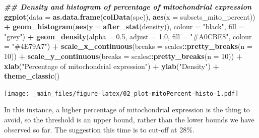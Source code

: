 \documentclass[
]{book}
\newenvironment{Shaded}{\begin{snugshade}}{\end{snugshade}}
\newcommand{\AttributeTok}[1]{\textcolor[rgb]{0.13,0.29,0.53}{#1}}
\newcommand{\DecValTok}[1]{\textcolor[rgb]{0.00,0.00,0.81}{#1}}
\newcommand{\DocumentationTok}[1]{\textcolor[rgb]{0.56,0.35,0.01}{\textbf{\textit{#1}}}}
\newcommand{\FloatTok}[1]{\textcolor[rgb]{0.00,0.00,0.81}{#1}}
\newcommand{\FunctionTok}[1]{\textcolor[rgb]{0.13,0.29,0.53}{\textbf{#1}}}
\newcommand{\NormalTok}[1]{#1}
\newcommand{\SpecialCharTok}[1]{\textcolor[rgb]{0.81,0.36,0.00}{\textbf{#1}}}
\newcommand{\StringTok}[1]{\textcolor[rgb]{0.31,0.60,0.02}{#1}}
\begin{document}
\begin{Shaded}
\begin{Highlighting}[]
\DocumentationTok{\#\# Density and histogram of percentage of mitochondrial expression}
\FunctionTok{ggplot}\NormalTok{(}\AttributeTok{data =} \FunctionTok{as.data.frame}\NormalTok{(}\FunctionTok{colData}\NormalTok{(spe)),}
       \FunctionTok{aes}\NormalTok{(}\AttributeTok{x =}\NormalTok{ subsets\_mito\_percent)) }\SpecialCharTok{+}
  \FunctionTok{geom\_histogram}\NormalTok{(}\FunctionTok{aes}\NormalTok{(}\AttributeTok{y =} \FunctionTok{after\_stat}\NormalTok{(density)), }
                 \AttributeTok{colour =} \StringTok{"black"}\NormalTok{, }
                 \AttributeTok{fill =} \StringTok{"grey"}\NormalTok{) }\SpecialCharTok{+}
  \FunctionTok{geom\_density}\NormalTok{(}\AttributeTok{alpha =} \FloatTok{0.5}\NormalTok{,}
               \AttributeTok{adjust =} \FloatTok{1.0}\NormalTok{,}
               \AttributeTok{fill =} \StringTok{"\#A0CBE8"}\NormalTok{,}
               \AttributeTok{colour =} \StringTok{"\#4E79A7"}\NormalTok{) }\SpecialCharTok{+}
  \FunctionTok{scale\_x\_continuous}\NormalTok{(}\AttributeTok{breaks =}\NormalTok{ scales}\SpecialCharTok{::}\FunctionTok{pretty\_breaks}\NormalTok{(}\AttributeTok{n =} \DecValTok{10}\NormalTok{)) }\SpecialCharTok{+} 
  \FunctionTok{scale\_y\_continuous}\NormalTok{(}\AttributeTok{breaks =}\NormalTok{ scales}\SpecialCharTok{::}\FunctionTok{pretty\_breaks}\NormalTok{(}\AttributeTok{n =} \DecValTok{10}\NormalTok{)) }\SpecialCharTok{+} 
  \FunctionTok{xlab}\NormalTok{(}\StringTok{"Percentage of mitochondrial expression"}\NormalTok{) }\SpecialCharTok{+} 
  \FunctionTok{ylab}\NormalTok{(}\StringTok{"Density"}\NormalTok{) }\SpecialCharTok{+} 
  \FunctionTok{theme\_classic}\NormalTok{()}
\end{Highlighting}
\end{Shaded}

\texttt{[image: \_main\_files/figure-latex/02\_plot-mitoPercent-histo-1.pdf]}

In this instance, a higher percentage of mitochondrial expression is the thing to avoid, so the threshold is an upper bound, rather than the lower bounds we have observed so far. The suggestion this time is to cut-off at 28\%.
\end{document}
